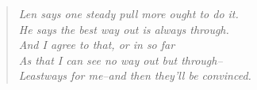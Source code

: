 \clearpage
\vspace*{5cm}
\thispagestyle{empty} 

\begin{verse}
\itshape
Len says one steady pull more ought to do it.\\
He says the best way out is always through.\\
And I agree to that, or in so far\\
As that I can see no way out but through--\\
Leastways for me--and then they’ll be convinced.
\end{verse}
